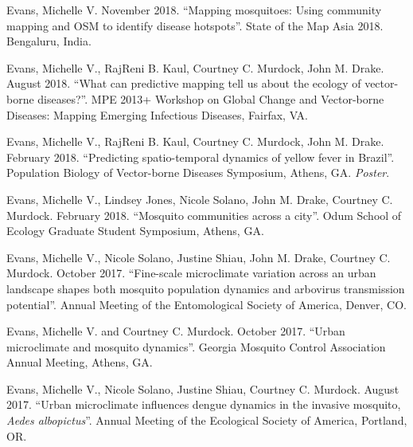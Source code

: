 
\begin{cvitems}
	\bigskip
	\item Evans, Michelle V. November 2018. ``Mapping mosquitoes: Using community mapping and OSM to identify disease hotspots''. State of the Map Asia 2018. Bengaluru, India.

	\item Evans, Michelle V., RajReni B. Kaul, Courtney C. Murdock, John M. Drake. August 2018. ``What can predictive mapping tell us about the ecology of vector-borne diseases?''. MPE 2013+ Workshop on Global Change and Vector-borne Diseases: Mapping Emerging Infectious Diseases, Fairfax, VA.

	\item Evans, Michelle V., RajReni B. Kaul, Courtney C. Murdock, John M. Drake. February 2018. ``Predicting spatio-temporal dynamics of yellow fever in Brazil''. Population Biology of Vector-borne Diseases Symposium, Athens, GA. \textit{Poster}.

	\item Evans, Michelle V., Lindsey Jones, Nicole Solano, John M. Drake, Courtney C. Murdock. February 2018. ``Mosquito communities across a city''. Odum School of Ecology Graduate Student Symposium, Athens, GA.

	\item Evans, Michelle V., Nicole Solano, Justine Shiau, John M. Drake, Courtney C. Murdock. October 2017. ``Fine-scale microclimate variation across an urban landscape shapes both mosquito population dynamics and arbovirus transmission potential''. Annual Meeting of the Entomological Society of America, Denver, CO.

	\item Evans, Michelle V. and Courtney C. Murdock. October 2017. ``Urban microclimate and mosquito dynamics''. Georgia Mosquito Control Association Annual Meeting, Athens, GA.

	\item Evans, Michelle V., Nicole Solano, Justine Shiau, Courtney C. Murdock. August 2017. ``Urban microclimate influences dengue dynamics in the invasive mosquito, \textit{Aedes albopictus}''. Annual Meeting of the Ecological Society of America, Portland, OR.


\end{cvitems}
